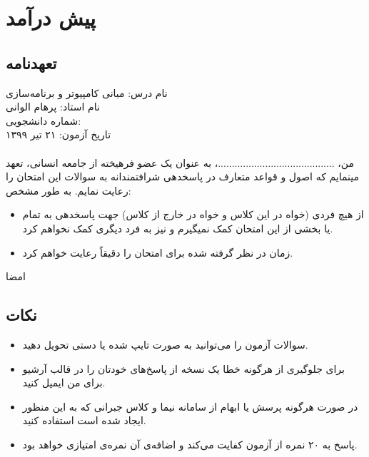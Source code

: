 \documentclass[../main.tex]{subfiles}
\begin{document}
\section{پیش درآمد}
\subsection{تعهدنامه}
نام درس:‌ مبانی کامپیوتر و برنامه‌سازی\\
نام استاد:‌ پرهام الوانی\\
شماره دانشجویی:‌ \hspace{2em}\\
تاریخ آزمون:‌ ۲۱ تیر ۱۳۹۹

\paragraph{}
من، ..........................................، به عنوان یک عضو فرهیخته از جامعه انسانی، تعهد مینمایم که اصول و قواعد متعارف در پاسخدهی
شرافتمندانه به سوالات این امتحان را رعایت نمایم. به طور مشخص:

\begin{itemize}
    \item  از هیچ فردی (خواه در این کلاس و خواه در خارج از کلاس) جهت پاسخدهی به تمام یا بخشی از این امتحان کمک نمیگیرم
    و نیز به فرد دیگری کمک نخواهم کرد.
    \item زمان در نظر گرفته شده برای امتحان را دقیقاً رعایت خواهم کرد.
\end{itemize}

امضا

\subsection{نکات}
\begin{itemize}
    \item سوالات آزمون را می‌توانید به صورت تایپ شده یا دستی تحویل دهید.
    \item برای جلوگیری از هرگونه خطا یک نسخه از پاسخ‌های خودتان را در قالب آرشیو برای من ایمیل کنید.
    \item در صورت هرگونه پرسش یا ابهام از سامانه نیما و کلاس جبرانی که به این منظور ایجاد شده است استفاده کنید.
    \item پاسخ به ۲۰ نمره از آزمون کفایت می‌کند و اضافه‌ی آن نمره‌ی امتیازی خواهد بود.
\end{itemize}
\end{document}
